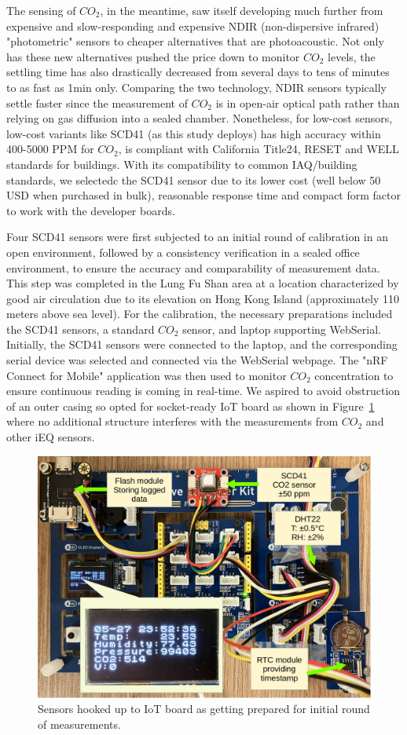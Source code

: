 \documentclass[preprint,12pt]{elsarticle}
\begin{document}
    The sensing of $CO_2$, in the meantime, saw itself developing much further from expensive and slow-responding and expensive NDIR (non-dispersive infrared) "photometric" sensors to cheaper alternatives that are photoacoustic. Not only has these new alternatives pushed the price down to monitor $CO_2$ levels, the settling time has also drastically decreased from several days\cite{emmerich2005} to tens of minutes\cite{fisk2008} to as fast as 1min only\cite{sensirion2021,sensirion_scd4x_nodate}. Comparing the two technology, NDIR sensors typically settle faster since the measurement of $CO_2$ is in open-air optical path rather than relying on gas diffusion into a sealed chamber. Nonetheless, for low-cost sensors, low-cost variants like SCD41 (as this study deploys) has high accuracy within 400-5000 PPM for $CO_2$, is compliant with California Title24, RESET and WELL standards for buildings\cite{senseair2020,sensirion2021}. With its compatibility to common IAQ/building standards, we selectedc the SCD41 sensor due to its lower cost (well below 50 USD when purchased in bulk), reasonable response time and compact form factor to work with the developer boards.

    Four SCD41 sensors were first subjected to an initial round of calibration in an open environment, followed by a consistency verification in a sealed office environment, to ensure the accuracy and comparability of measurement data\cite{28}. This step was completed in the Lung Fu Shan area at a location characterized by good air circulation due to its elevation on Hong Kong Island (approximately 110 meters above sea level). For the calibration, the necessary preparations included the SCD41 sensors, a standard $CO_2$ sensor, and laptop supporting WebSerial. Initially, the SCD41 sensors were connected to the laptop, and the corresponding serial device was selected and connected via the WebSerial webpage. The "nRF Connect for Mobile" application was then used to monitor $CO_2$ concentration to ensure continuous reading is coming in real-time. We aspired to avoid obstruction of an outer casing so opted for socket-ready IoT board as shown in Figure~\ref{fig:equipment-setup} where no additional structure interferes with the measurements from $CO_2$ and other iEQ sensors.

    \begin{figure}[h]
        \centering
        \includegraphics[width=0.5\linewidth]{img/setup.png}
        \caption{Sensors hooked up to IoT board as getting prepared for initial round of measurements.}
        \label{fig:equipment-setup}
    \end{figure}
    
\end{document}
